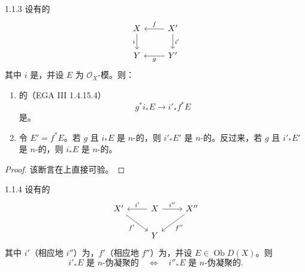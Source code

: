 \begin{SGAresult}{}{1.1.3}
设有的
\[
\begin{tikzcd}X\arrow[d,"i"']&X'\arrow[l,"f"']\arrow[d,"i'"]\\Y&Y'\arrow[l,"g"]\end{tikzcd}
\]
其中 $i$ 是，并设 $E$ 为 $\mathcal O_X$-模。则：
\begin{enumerate}
\item[(i)] 的（EGA III 1.4.15.4）
\[g^*i_*E\longrightarrow i'_*f^*E\]
是。
\item[(ii)] 令 $E'=f^*E$。若 $g$ 且 $i_*E$ 是 $n$-的，则 $i'_*E'$ 是 $n$-的。反过来，若 $g$ 且 $i'_*E'$ 是 $n$-的，则 $i_*E$ 是 $n$-的。
\end{enumerate}
\end{SGAresult}
\begin{proof}该断言在上直接可验。\end{proof}
\begin{SGAresult}{}{1.1.4}
设有的
\[
\begin{tikzcd}X'\arrow[dr,"f'"']&X\arrow[l,"i'"']\arrow[r,"i''"]&X''\arrow[dl,"f''"]\\&Y&\end{tikzcd}
\]
其中 $i'$（相应地 $i''$）为，$f'$（相应地 $f''$）为，并设 $E\in\operatorname{Ob}D(X)$。则
\[
i'_*E\text{ 是 }n\text{-伪凝聚的}\quad\Longleftrightarrow\quad i''_*E\text{ 是 }n\text{-伪凝聚的}.
\]
\end{SGAresult}
